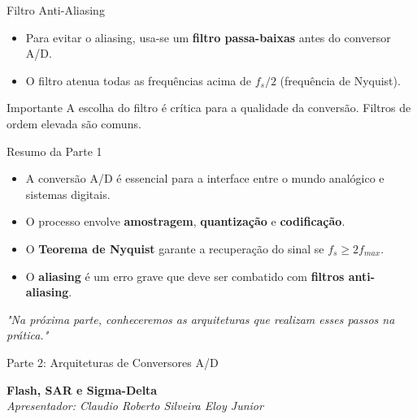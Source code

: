 \documentclass{beamer}
\begin{document}
\begin{frame}{Filtro Anti-Aliasing}
    \begin{itemize}
        \item Para evitar o aliasing, usa-se um \textbf{filtro passa-baixas} antes do conversor A/D.
        \item O filtro atenua todas as frequências acima de $f_s/2$ (frequência de Nyquist).
    \end{itemize}
    \begin{figure}
        \centering
    \end{figure}
    \vspace{0.2cm}
    \begin{alertblock}{Importante}
        A escolha do filtro é crítica para a qualidade da conversão. Filtros de ordem elevada são comuns.
    \end{alertblock}
\end{frame}

\begin{frame}{Resumo da Parte 1}
    \begin{itemize}
        \item A conversão A/D é essencial para a interface entre o mundo analógico e sistemas digitais.
        \item O processo envolve \textbf{amostragem}, \textbf{quantização} e \textbf{codificação}.
        \item O \textbf{Teorema de Nyquist} garante a recuperação do sinal se $f_s \ge 2 f_{max}$.
        \item O \textbf{aliasing} é um erro grave que deve ser combatido com \textbf{filtros anti-aliasing}.
    \end{itemize}
    \vspace{0.5cm}
    \begin{center}
        \textit{"Na próxima parte, conheceremos as arquiteturas que realizam esses passos na prática."}
    \end{center}
\end{frame}


\begin{frame}{Parte 2: Arquiteturas de Conversores A/D}
    \begin{center}
        \Large{\textbf{Flash, SAR e Sigma-Delta}} \\
        \vspace{0.5cm}
        \textit{Apresentador: Claudio Roberto Silveira Eloy Junior}
    \end{center}
\end{frame}
\end{document}

